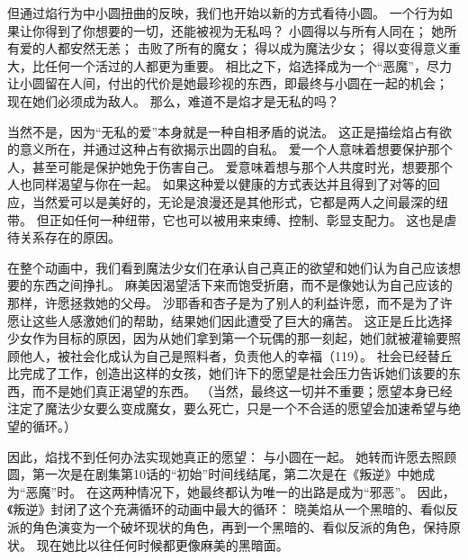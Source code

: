 但通过焰行为中小圆扭曲的反映，我们也开始以新的方式看待小圆。
一个行为如果让你得到了你想要的一切，还能被视为无私吗？
小圆得以与所有人同在；
她所有爱的人都安然无恙；
击败了所有的魔女；
得以成为魔法少女；
得以变得意义重大，比任何一个活过的人都更为重要。
相比之下，焰选择成为一个“恶魔”，尽力让小圆留在人间，付出的代价是她最珍视的东西，即最终与小圆在一起的机会；
现在她们必须成为敌人。
那么，难道不是焰才是无私的吗？

当然不是，因为“无私的爱”本身就是一种自相矛盾的说法。
这正是描绘焰占有欲的意义所在，并通过这种占有欲揭示出圆的自私。
爱一个人意味着想要保护那个人，甚至可能是保护她免于伤害自己。
爱意味着想与那个人共度时光，想要那个人也同样渴望与你在一起。
如果这种爱以健康的方式表达并且得到了对等的回应，当然爱可以是美好的，无论是浪漫还是其他形式，它都是两人之间最深的纽带。
但正如任何一种纽带，它也可以被用来束缚、控制、彰显支配力。
这也是虐待关系存在的原因。

在整个动画中，我们看到魔法少女们在承认自己真正的欲望和她们认为自己应该想要的东西之间挣扎。
麻美因渴望活下来而饱受折磨，而不是像她认为自己应该的那样，许愿拯救她的父母。
沙耶香和杏子是为了别人的利益许愿，而不是为了许愿让这些人感激她们的帮助，结果她们因此遭受了巨大的痛苦。
这正是丘比选择少女作为目标的原因，因为从她们拿到第一个玩偶的那一刻起，她们就被灌输要照顾他人，被社会化成认为自己是照料者，负责他人的幸福（119）。
社会已经替丘比完成了工作，创造出这样的女孩，她们许下的愿望是社会压力告诉她们该要的东西，而不是她们真正渴望的东西。
（当然，最终这一切并不重要；愿望本身已经注定了魔法少女要么变成魔女，要么死亡，只是一个不合适的愿望会加速希望与绝望的循环。）

因此，焰找不到任何办法实现她真正的愿望：
与小圆在一起。
她转而许愿去照顾圆，第一次是在剧集第10话的“初始”时间线结尾，第二次是在《叛逆》中她成为“恶魔”时。
在这两种情况下，她最终都认为唯一的出路是成为“邪恶”。
因此，《叛逆》封闭了这个充满循环的动画中最大的循环：
晓美焰从一个黑暗的、看似反派的角色演变为一个破坏现状的角色，再到一个黑暗的、看似反派的角色，保持原状。
现在她比以往任何时候都更像麻美的黑暗面。

